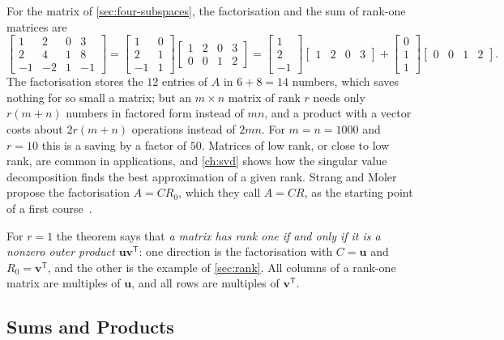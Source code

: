 For the matrix of \cref{sec:four-subspaces}, the factorisation and the sum of rank-one matrices are
\[
\begin{bmatrix}1&2&0&3\\2&4&1&8\\-1&-2&1&-1\end{bmatrix}
=\begin{bmatrix}1&0\\2&1\\-1&1\end{bmatrix}\begin{bmatrix}1&2&0&3\\0&0&1&2\end{bmatrix}
=\begin{bmatrix}1\\2\\-1\end{bmatrix}\begin{bmatrix}1&2&0&3\end{bmatrix}+\begin{bmatrix}0\\1\\1\end{bmatrix}\begin{bmatrix}0&0&1&2\end{bmatrix}.
\]
The factorisation stores the $12$ entries of $A$ in $6+8=14$ numbers, which saves nothing for so small a matrix; but an $m\times n$ matrix of rank $r$ needs only $r(m+n)$ numbers in factored form instead of $mn$, and a product with a vector costs about $2r(m+n)$ operations instead of $2mn$. For $m=n=1000$ and $r=10$ this is a saving by a factor of $50$. Matrices of low rank, or close to low rank, are common in applications, and \cref{ch:svd} shows how the singular value decomposition finds the best approximation of a given rank. Strang and Moler propose the factorisation $A=CR_0$, which they call $A=CR$, as the starting point of a first course~\cite{strang2022}.

For $r=1$ the theorem says that \emph{a matrix has rank one if and only if it is a nonzero outer product $\mathbf u\mathbf v^{\mathsf T}$}: one direction is the factorisation with $C=\mathbf u$ and $R_0=\mathbf v^{\mathsf T}$, and the other is the example of \cref{sec:rank}. All columns of a rank-one matrix are multiples of $\mathbf u$, and all rows are multiples of $\mathbf v^{\mathsf T}$.

\subsection{Sums and Products}


